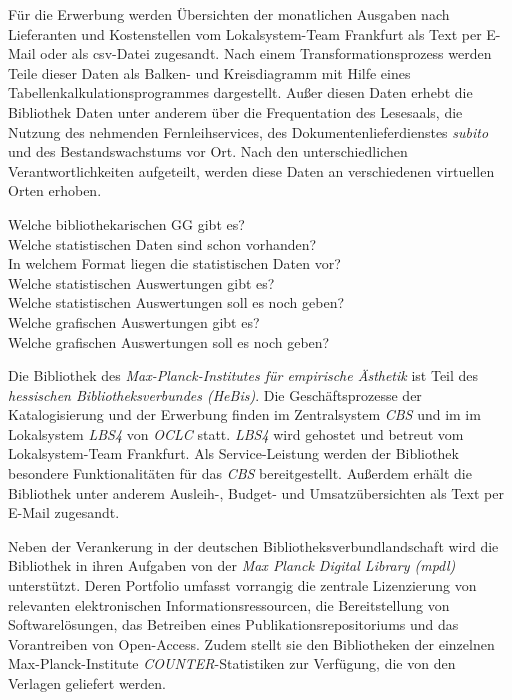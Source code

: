 Für die Erwerbung werden Übersichten der monatlichen Ausgaben nach Lieferanten und Kostenstellen vom
Lokalsystem-Team Frankfurt als Text per E-Mail oder als csv-Datei zugesandt. Nach einem Transformationsprozess 
werden Teile dieser Daten als Balken- und Kreisdiagramm mit Hilfe eines Tabellenkalkulationsprogrammes 
dargestellt. Außer diesen Daten erhebt die Bibliothek Daten unter anderem über
die Frequentation des Lesesaals, die Nutzung des nehmenden Fernleihservices, des
Dokumentenlieferdienstes \textit{subito} und des Bestandswachstums vor Ort.
Nach den unterschiedlichen Verantwortlichkeiten aufgeteilt, werden diese Daten an verschiedenen virtuellen Orten erhoben.




Welche bibliothekarischen GG gibt es?\\
Welche statistischen Daten sind schon vorhanden?\\
In welchem Format liegen die statistischen Daten vor?\\
Welche statistischen Auswertungen gibt es?\\
Welche statistischen Auswertungen soll es noch geben?\\
Welche grafischen Auswertungen gibt es?\\
Welche grafischen Auswertungen soll es noch geben?



Die Bibliothek des \textit{Max-Planck-Institutes für empirische Ästhetik}
ist Teil des \textit{hessischen Bibliotheksverbundes (HeBis)}. Die Geschäftsprozesse
der Katalogisierung und der Erwerbung finden im Zentralsystem \textit{CBS} und im im Lokalsystem \textit{LBS4} von
\textit{OCLC} statt. \textit{LBS4} wird gehostet und betreut vom Lokalsystem-Team Frankfurt. Als Service-Leistung werden der Bibliothek besondere Funktionalitäten
für das \textit{CBS} bereitgestellt. Außerdem erhält die Bibliothek unter anderem Ausleih-, Budget- und
Umsatzübersichten als Text per E-Mail zugesandt.


Neben der Verankerung in der deutschen Bibliotheksverbundlandschaft
wird die Bibliothek in ihren Aufgaben von der
\textit{Max Planck Digital Library (mpdl)}
unterstützt. Deren Portfolio umfasst vorrangig die zentrale Lizenzierung
von relevanten elektronischen Informationsressourcen, die Bereitstellung
von Softwarelösungen, das Betreiben eines Publikationsrepositoriums und
das Vorantreiben von Open-Access. Zudem stellt sie den Bibliotheken der einzelnen Max-Planck-Institute
\textit{COUNTER}-Statistiken zur Verfügung, die von den Verlagen geliefert werden.



